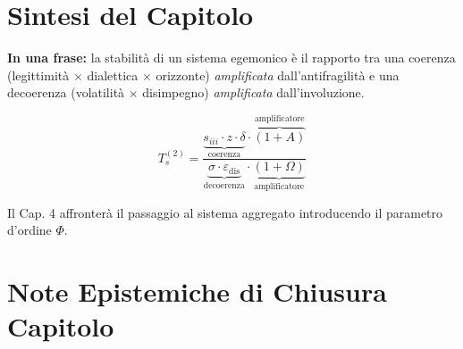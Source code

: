 \section{Sintesi del Capitolo}\label{sintesi-del-capitolo}

\Proved{} \textbf{In una frase:} la stabilità di un sistema egemonico è
il rapporto tra una coerenza (legittimità $\times$ dialettica $\times$ orizzonte)
\emph{amplificata} dall'antifragilità e una decoerenza (volatilità $\times$
disimpegno) \emph{amplificata} dall'involuzione.

\[
T_s^{(2)} = \frac{\underbrace{s_{iii} \cdot z \cdot \delta}_{\text{coerenza}} \cdot \overbrace{(1+A)}^{\text{amplificatore}}}{\underbrace{\sigma \cdot \varepsilon_{\text{dis}}}_{\text{decoerenza}} \cdot \underbrace{(1+\Omega)}_{\text{amplificatore}}}
\]

Il Cap. 4 affronterà il passaggio al sistema aggregato introducendo il
parametro d'ordine \(\Phi\).



\section{Note Epistemiche di Chiusura
Capitolo}\label{note-epistemiche-di-chiusura-capitolo}

